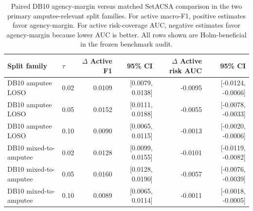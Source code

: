 \begin{table}[!t]
\centering
\caption{Paired DB10 agency-margin versus matched SetACSA comparison in the two primary amputee-relevant split families. For active macro-F1, positive estimates favor agency-margin. For active risk-coverage AUC, negative estimates favor agency-margin because lower AUC is better. All rows shown are Holm-beneficial in the frozen benchmark audit.}
\label{tab:setacsa-paired}
\footnotesize
\begin{tabular}{llrrrr}
\toprule
Split family & $\tau$ & $\Delta$ Active F1 & 95\% CI & $\Delta$ Active risk AUC & 95\% CI \\
\midrule
DB10 amputee LOSO & 0.02 & 0.0109 & [0.0079, 0.0138] & -0.0095 & [-0.0124, -0.0066] \\
DB10 amputee LOSO & 0.05 & 0.0152 & [0.0111, 0.0188] & -0.0055 & [-0.0078, -0.0033] \\
DB10 amputee LOSO & 0.10 & 0.0090 & [0.0065, 0.0115] & -0.0013 & [-0.0020, -0.0006] \\
DB10 mixed-to-amputee & 0.02 & 0.0128 & [0.0099, 0.0155] & -0.0101 & [-0.0119, -0.0082] \\
DB10 mixed-to-amputee & 0.05 & 0.0160 & [0.0128, 0.0190] & -0.0057 & [-0.0076, -0.0039] \\
DB10 mixed-to-amputee & 0.10 & 0.0089 & [0.0065, 0.0114] & -0.0011 & [-0.0018, -0.0005] \\
\bottomrule
\end{tabular}
\end{table}

